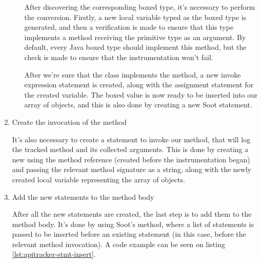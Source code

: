 \begin{enumerate}
\begin{enumerate}
        After discovering the corresponding boxed type, it's necessary to perform the conversion. Firstly, a new local variable typed as the boxed type is generated, and then a verification is made to ensure that this type implements a  method receiving the primitive type as an argument. By default, every Java boxed type should implement this method, but the check is made to ensure that the instrumentation won't fail.

        After we're sure that the class implements the  method, a new invoke expression statement is created, along with the assignment statement for the created variable. The boxed value is now ready to be inserted into our array of objects, and this is also done by creating a new Soot statement.
    \end{enumerate}

    \item Create the invocation of the  method

    It's also necessary to create a statement to invoke our  method, that will log the tracked method and its collected arguments. This is done by creating a new  using the  method reference (created before the instrumentation began) and passing the relevant method signature as a string, along with the newly created local variable representing the array of objects.

    \item Add the new statements to the method body

    After all the new statements are created, the last step is to add them to the method body. It's done by using Soot's  method, where a list of statements is passed to be inserted before an existing statement (in this case, before the relevant method invocation). A code example can be seen on listing \ref{lst:apitracker-stmt-insert}.
\end{enumerate}

